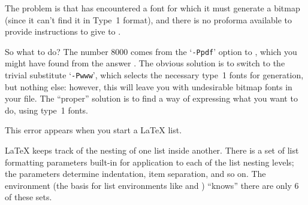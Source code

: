 {The problem is that  has encountered a font for which
it must generate a bitmap (since it can't find it in Type~1 format),
and there is no proforma available to provide instructions to give to
\MF{}.

So what to do?  The number 8000 comes from the `\texttt{-Ppdf}' option
to , which you might have found from the answer
\nothtml{)}.  The obvious
solution is to switch to the trivial substitute `\texttt{-Pwww}',
which selects the necessary type~1 fonts for  generation,
but nothing else: however, this will leave you with undesirable bitmap
fonts in your  file.  The ``proper'' solution is to find a
way of expressing what you want to do, using type~1 fonts.


This error appears when you start a \LaTeX{} list.

\LaTeX{} keeps track of the nesting of one list inside another.  There
is a set of list formatting parameters built-in for application to
each of the list nesting levels; the parameters determine indentation,
item separation, and so on.  The  environment (the
basis for list environments like  and
) ``knows'' there are only 6 of these sets.

}
